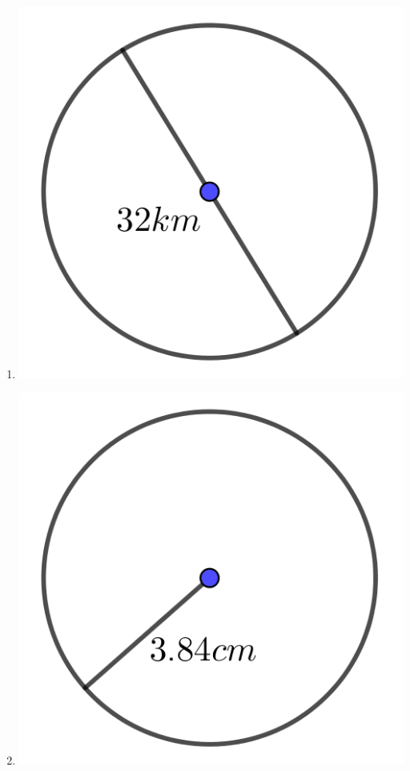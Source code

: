 \begin{multicols}{2}
\begin{enumerate}
	\item \includegraphics{./Images/Measurement/CircleAreaEx5.png}
	\item \includegraphics{./Images/Measurement/CircleAreaEx6.png}
\end{enumerate}
\end{multicols}

